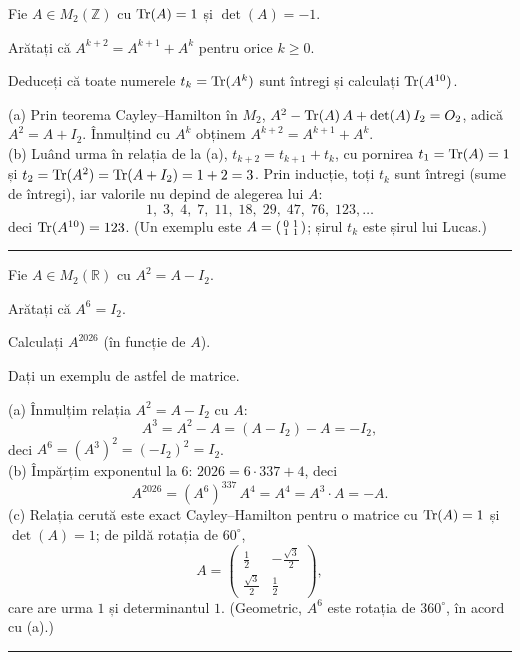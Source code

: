 Fie $A\in M_2(\mathbb{Z})$ cu $\operatorname{Tr}(A)=1$ și $\det(A)=-1$.
\begin{parti}
  \item Arătați că $A^{k+2}=A^{k+1}+A^{k}$ pentru orice $k\ge0$.
  \item Deduceți că toate numerele $t_k=\operatorname{Tr}(A^k)$ sunt întregi și calculați $\operatorname{Tr}(A^{10})$.
\end{parti}
\sol (a) Prin teorema Cayley--Hamilton în $M_2$, $A^2-\operatorname{Tr}(A)\,A+\det(A)\,I_2=O_2$, adică $A^2=A+I_2$. Înmulțind cu $A^k$ obținem $A^{k+2}=A^{k+1}+A^k$.\\[2pt]
(b) Luând urma în relația de la (a), $t_{k+2}=t_{k+1}+t_k$, cu pornirea $t_1=\operatorname{Tr}(A)=1$ și $t_2=\operatorname{Tr}(A^2)=\operatorname{Tr}(A+I_2)=1+2=3$. Prin inducție, toți $t_k$ sunt întregi (sume de întregi), iar valorile nu depind de alegerea lui $A$:
\[ 1,\;3,\;4,\;7,\;11,\;18,\;29,\;47,\;76,\;123,\dots \]
deci $\operatorname{Tr}(A^{10})=123$. (Un exemplu este $A=\begin{psmallmatrix}0&1\\1&1\end{psmallmatrix}$; șirul $t_k$ este șirul lui Lucas.)
\vspace{1mm}\hrule

Fie $A\in M_2(\mathbb{R})$ cu $A^2=A-I_2$.
\begin{parti}
  \item Arătați că $A^6=I_2$.
  \item Calculați $A^{2026}$ (în funcție de $A$).
  \item Dați un exemplu de astfel de matrice.
\end{parti}
\sol (a) Înmulțim relația $A^2=A-I_2$ cu $A$:
\[ A^3=A^2-A=(A-I_2)-A=-I_2, \]
deci $A^6=(A^3)^2=(-I_2)^2=I_2$.\\[2pt]
(b) Împărțim exponentul la $6$: $2026=6\cdot337+4$, deci
\[ A^{2026}=(A^6)^{337}\,A^4=A^4=A^3\cdot A=-A. \]
(c) Relația cerută este exact Cayley--Hamilton pentru o matrice cu $\operatorname{Tr}(A)=1$ și $\det(A)=1$; de pildă rotația de $60^\circ$,
\[ A=\begin{pmatrix}\tfrac12&-\tfrac{\sqrt3}{2}\\[2pt] \tfrac{\sqrt3}{2}&\tfrac12\end{pmatrix}, \]
care are urma $1$ și determinantul $1$. (Geometric, $A^6$ este rotația de $360^\circ$, în acord cu (a).)
\vspace{1mm}\hrule

